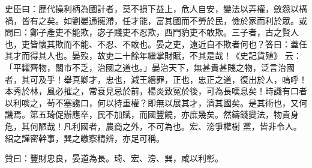 \begin{pinyinscope}
 史臣曰：歷代操利柄為國計者，莫不損下益上，危人自安，變法以弄權，斂怨以構禍，皆有之矣。如劉晏通擁滯，任才能，富其國而不勞於民，儉於家而利於眾。或問曰：鄭子產吏不能欺，宓子賤吏不忍欺，西門豹吏不敢欺。三子者，古之賢人也，吏皆懷其欺而不能、不忍、不敢也。晏之吏，遠近自不欺者何也？答曰：蓋任其才而得其人也。晏歿，故吏二十餘年繼掌財賦，不其是哉！《史記貨殖》
 云：「平糶齊物，關市不乏，治國之道也。」晏治天下，無甚貴甚賤之物，泛言治國者，其可及乎！舉真卿才，忠也，減王縉罪，正也，忠正之道，復出於人，嗚呼！本秀於林，風必摧之，常袞見忌於前，楊炎致冤於後，可為長嘆息矣！時譏有口者以利啖之，茍不塞讒口，何以持重權？即無以展其才，濟其國矣。是其術也，又何譏焉。第五琦促辦應卒，民不加賦，而國豐饒，亦庶幾矣。然鑄錢變法，物貴身危，其何陋哉！凡利國者，農商之外，不可為也。宏、滂爭權樹
 黨，皆非令人。紹之謹密幹事，巽之皦察精辨，亦足可稱。



 贊曰：豐財忠良，晏道為長。琦、宏、滂、巽，咸以利彰。



\end{pinyinscope}